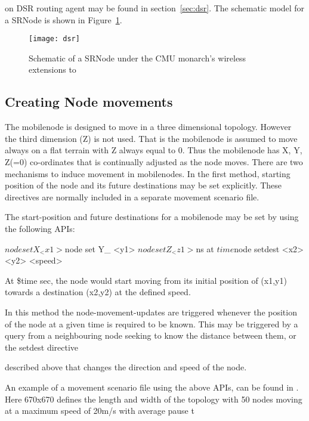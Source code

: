 on DSR routing agent may be found in section~\ref{sec:dsr}. The schematic model for a SRNode is shown in Figure~\ref{fig:mobilenode-dsr}.
\begin{figure}[tb]
    \centerline{\texttt{[image: dsr]}}
    \caption{Schematic of a SRNode under the CMU monarch's wireless extensions to \ns}
    \label{fig:mobilenode-dsr}
\end{figure}

\subsection{Creating Node movements}
\label{sec:mobilenode-movements}

The mobilenode is designed to move in a three dimensional topology. However the third dimension (Z) is not used. That is the mobilenode is assumed to move always on a flat terrain with Z always equal to 0.
Thus the mobilenode has X, Y, Z(=0) co-ordinates that is continually adjusted as the node moves. There are two mechanisms to induce movement in mobilenodes. 
In the first method, starting position of the node and its future destinations may be set explicitly. These directives are normally included in a separate movement scenario file. 

The start-position and future destinations for a mobilenode may be set by using the following APIs:

\begin{program}

$node set X_ <x1>
$node set Y_ <y1>
$node set Z_ <z1>

$ns at $time $node setdest <x2> <y2> <speed>
\end{program}
At \$time sec, the node would start moving from its initial position 
of (x1,y1) towards a destination (x2,y2) at the defined speed.

In this method the node-movement-updates are triggered whenever the position of the node at a given time is required to be known. This may be triggered by a query from a neighbouring node seeking to know the distance between them, or the setdest directive









 described above that changes the direction and speed of the node.

An example of a movement scenario file using the above APIs, can be found in . Here 670x670 defines the length and width of the topology with 50 nodes moving at a maximum speed of 20m/s with average pause t









